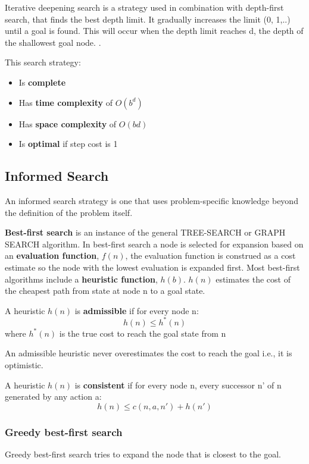 \documentclass{article}
\begin{document}
Iterative deepening search is a strategy used in combination with depth-first search, that finds the best depth limit. It gradually increases the limit (0, 1,..) until a goal is found. This will occur when the depth limit reaches d, the depth of the shallowest goal node. . 

This search strategy:
\begin{itemize}
    \item Is \textbf{complete} 
    \item Has \textbf{time complexity} of $O(b^d)$ 
    \item Has \textbf{space complexity} of $O(bd)$
    \item Is \textbf{optimal} if step cost is 1
\end{itemize}

\subsection{Informed Search}

An informed search strategy is one that uses problem-specific knowledge beyond the definition of the problem itself.

\textbf{Best-first search} is an instance of the general TREE-SEARCH or GRAPH SEARCH algorithm. In best-first search a node is selected for expansion based on an \textbf{evaluation function}, $f(n)$, the evaluation function is construed as a cost estimate so the node with the lowest evaluation is expanded first. 
Most best-first algorithms include a \textbf{heuristic function}, $h(b)$. $h(n)$ estimates the cost of the cheapest path from state at node n to a goal state.  

A heuristic $h(n)$ is \textbf{admissible} if for every node n: $$h(n) \leq h^*(n)$$ where $h^*(n)$ is the true cost to reach the goal state from n 

An admissible heuristic never overestimates the cost to reach the goal i.e., it is optimistic. 

A heuristic $h(n)$ is \textbf{consistent} if for every node n, every successor n' of n generated by any action a: $$h(n) \leq c(n, a, n') + h(n')$$ 


\subsubsection{Greedy best-first search}

Greedy best-first search tries to expand the node that is closest to the goal.
\end{document}
